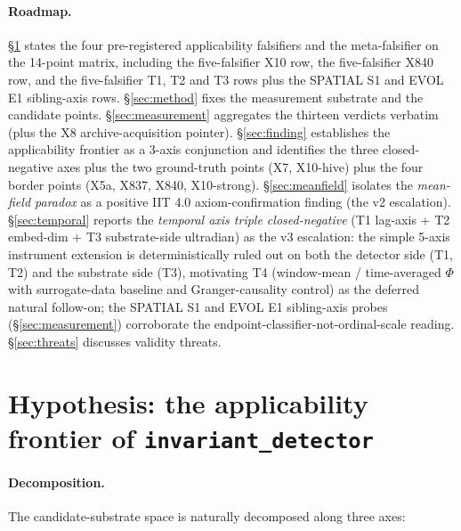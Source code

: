 \documentclass[11pt,a4paper]{article}
\begin{document}
\paragraph{Roadmap.} \S\ref{sec:hypothesis} states the four pre-registered
applicability falsifiers and the meta-falsifier on the 14-point matrix,
including the five-falsifier X10 row, the five-falsifier X840 row, and
the five-falsifier T1, T2 and T3 rows plus the SPATIAL S1 and EVOL E1
sibling-axis rows.
\S\ref{sec:method} fixes the measurement substrate and the candidate
points. \S\ref{sec:measurement} aggregates the thirteen verdicts
verbatim (plus the X8 archive-acquisition pointer).
\S\ref{sec:finding} establishes the applicability frontier as a 3-axis
conjunction and identifies the three closed-negative axes plus the
two ground-truth points (X7, X10-hive) plus the four border points
(X5a, X837, X840, X10-strong).
\S\ref{sec:meanfield} isolates the \emph{mean-field paradox} as a
positive IIT 4.0 axiom-confirmation finding (the v2 escalation).
\S\ref{sec:temporal} reports the \emph{temporal axis triple
closed-negative} (T1 lag-axis + T2 embed-dim + T3 substrate-side
ultradian) as the v3 escalation: the simple 5-axis instrument
extension is deterministically ruled out on both the detector side
(T1, T2) and the substrate side (T3), motivating T4 (window-mean /
time-averaged $\Phi$ with surrogate-data baseline and
Granger-causality control) as the deferred natural follow-on; the
SPATIAL S1 and EVOL E1 sibling-axis probes (\S\ref{sec:measurement})
corroborate the endpoint-classifier-not-ordinal-scale reading.
\S\ref{sec:threats} discusses validity threats.

\section{Hypothesis: the applicability frontier of \texttt{invariant\_detector}}
\label{sec:hypothesis}

\paragraph{Decomposition.} The candidate-substrate space is naturally
decomposed along three axes:
\end{document}
